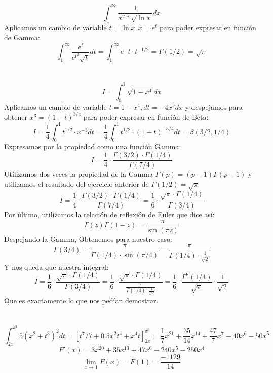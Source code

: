 \documentclass[12pt,a4paper,oneside,onecolumn]{article}
\begin{document}
 
    \section{}
    \[
        \int_{1}^{\infty}{\frac{1}{x^2*\sqrt{\ln{x}}} dx}
    \]
    Aplicamos un cambio de variable $t=\ln{x}, x= e^t$ para poder expresar en funci\'on de Gamma:
    \[
        \int_{1}^{\infty}{\frac{e^t}{e^{t^2}\sqrt{t}} dt} = 
        \int_{1}^{\infty}{e^-t \cdot t^{-1/2}} = \Gamma{(1/2)} = \sqrt{\pi}
    \]
    \section{}
    \[
        I = \int_{0}^{1}{\sqrt{1-x^4} dx}
    \]
    Aplicamos un cambio de variable $t=1-x^4, dt= -4x^3dx$ y despejamos para obtener $x^3=(1-t)^{3/4}$ para poder expresar en funci\'on de Beta:
    \[
        I = \frac{1}{4}\int_{0}^{1}{t^{1/2} \cdot x^{-3} dt} = \frac{1}{4}\int_{0}^{1}{t^{1/2} \cdot (1-t)^{-3/4} dt} = \beta{(3/2,1/4)}
    \]
    Expresamos por la propiedad como una funci\'on Gamma:
    \[
    I = \frac{1}{4} \cdot \frac{\Gamma{(3/2) \cdot \Gamma{(1/4)}}}{\Gamma{(7/4)}}
    \]
    Utilizamos dos veces la propiedad de la Gamma $\Gamma{(p)} = (p-1)\Gamma{(p-1)}$ y utilizamos el resultado del ejercicio anterior de $\Gamma{(1/2)} = \sqrt{\pi}$
    \[
    I = \frac{1}{4} \cdot \frac{\Gamma{(3/2) \cdot \Gamma{(1/4)}}}{\Gamma{(7/4)}} = 
    \frac{1}{6} \cdot \frac{\sqrt{\pi} \cdot \Gamma{(1/4)}}{\Gamma{(3/4)}}
    \]
    Por \'ultimo, utilizamos la relaci\'on de reflexi\'on de Euler que dice as\'i:
    \[
        \Gamma{(z)}\Gamma{(1-z)} = \frac{\pi}{\sin{(\pi z)}}
    \]
    Despejando la Gamma, Obtenemos para nuestro caso:
    \[
        \Gamma{(3/4)} = \frac{\pi}{\Gamma{(1/4)} \cdot \sin{( \pi/4)}} = \frac{\pi}{\Gamma{(1/4)} \cdot \frac{1}{\sqrt{2}}}
    \]
    Y nos queda que nuestra integral:
    \[
        I = 
    \frac{1}{6} \cdot \frac{\sqrt{\pi} \cdot \Gamma{(1/4)}}{\Gamma{(3/4)}} =
    \frac{1}{6} \cdot \frac{\sqrt{\pi} \cdot \Gamma{(1/4)}}{\frac{\pi}{\Gamma{(1/4)} \cdot \frac{1}{\sqrt{2}}}} = 
    \frac{1}{6} \cdot \frac{\Gamma^2{(1/4)}}{\sqrt{\pi}} \cdot \frac{1}{\sqrt{2}}
    \]
    Que es exactamente lo que nos ped\'ian demostrar.
    \section{}
    \[
        \int_{2x}^{x^3}{5(x^2+t^3)^2}dt = [t^7/7 +0.5x^2t^4 +x^4t]^{x^3}_{2x} = \frac{1}{7}x^21 + \frac{35}{14}x^14 + \frac{47}{7}x^7 - 40x^6 -50x^5
    \]
    \[
        F'(x) = 3x^{20} + 35x^{13} +47x^6 - 240x^5 -250x^4
    \]
    \[
        \lim_{x \to 1}{F(x)} = F(1) = \frac{-1129}{14}
    \]
    
\end{document}
